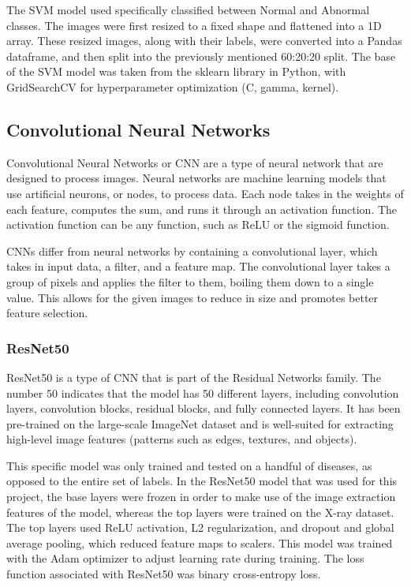 \documentclass{article}
\theoremstyle{plain}
\theoremstyle{definition}
\theoremstyle{remark}
\begin{document}
The SVM model used specifically classified between Normal and Abnormal classes. The images were first
resized to a fixed shape and flattened into a 1D array. These resized images, along with their labels,
were converted into a Pandas dataframe, and then split into the previously mentioned 60:20:20 split.
The base of the SVM model was taken from the sklearn library in Python, with GridSearchCV for
hyperparameter optimization (C, gamma, kernel).

\subsection{Convolutional Neural Networks}
\label{section:cnn}
Convolutional Neural Networks or CNN are a type of neural network that are designed to process images.
Neural networks are machine learning models that use artificial neurons, or nodes, to process data.
Each node takes in the weights of each feature, computes the sum, and runs it through an activation
function. The activation function can be any function, such as ReLU or the sigmoid function. 

CNNs differ from neural networks by containing a convolutional layer, which takes in input data,
a filter, and a feature map. The convolutional layer takes a group of pixels and applies the filter
to them, boiling them down to a single value. This allows for the given images to reduce in size and
promotes better feature selection. 

\subsubsection{ResNet50}
ResNet50 is a type of CNN that is part of the Residual Networks family. The number 50 indicates that
the model has 50 different layers, including convolution layers, convolution blocks, residual blocks,
and fully connected layers. It has been pre-trained on the large-scale ImageNet dataset and is
well-suited for extracting high-level image features (patterns such as edges, textures, and objects). 

This specific model was only trained and tested on a handful of diseases, as opposed to the entire
set of labels. In the ResNet50 model that was used for this project, the base layers were frozen in order to make
use of the image extraction features of the model, whereas the top layers were trained on the X-ray
dataset. The top layers used ReLU activation, L2 regularization, and dropout and global
average pooling, which reduced feature maps to scalers. This model was trained with the Adam optimizer
to adjust learning rate during training. The loss function associated with ResNet50 was binary
cross-entropy loss.
\end{document}
